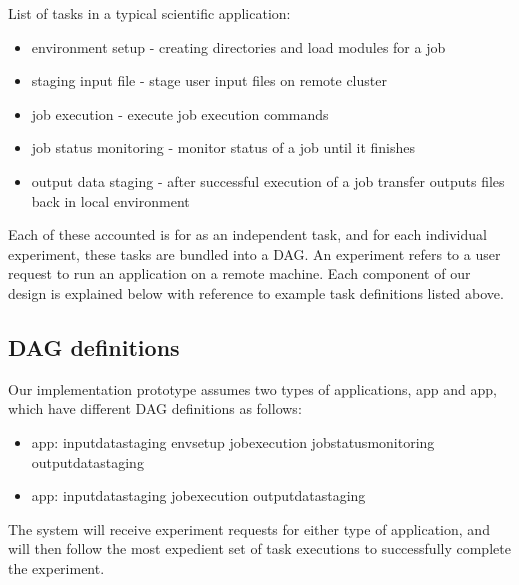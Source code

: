 \documentclass[sigconf]{acmart}
\begin{document}
List of tasks in a typical scientific application:
\begin{itemize}
\item environment setup - creating directories and load modules for a job
\item staging input file - stage user input files on remote cluster
\item job execution - execute job execution commands
\item job status monitoring - monitor status of a job until it finishes 
\item output data staging - after successful execution of a job transfer outputs files back in local environment
\end{itemize}

Each of these accounted is for as an independent task, and for each individual experiment, these tasks are bundled into a DAG. An experiment refers to a user request to run an application on a remote machine. Each component of our design is explained below with reference to example task definitions listed above.

\subsection{DAG definitions}
Our implementation prototype assumes two types of applications, app and app, which have different DAG definitions as follows:
\begin{itemize}
\item app: input\textunderscore datastaging \textrightarrow  env\textunderscore setup  \textrightarrow  job\textunderscore execution  \textrightarrow  job\textunderscore status\textunderscore monitoring  \textrightarrow  output\textunderscore datastaging
\item app: input\textunderscore datastaging  \textrightarrow  job\textunderscore execution  \textrightarrow  output\textunderscore datastaging
\end{itemize}

The system will receive experiment requests for either type of application, and will then follow the most expedient set of task executions to successfully complete the experiment.
\end{document}
